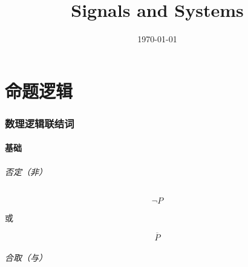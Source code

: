 \documentclass{article}
\title{Signals and Systems}
\author{}
\date{\today}
\begin{document}
\hypersetup{
    hidelinks,
    allcolors = black,
    breaklinks = true
}

\newtheorem{definition}{Definition}[subsection]
\newtheorem{theorem}{Theorem}[subsection]
\newtheorem{corollary}{Corollary}[theorem]
\renewcommand{\proofname}{\indent\bf Proof}

\def\e{\mathrm e}
\def\i{\mathrm i}
\def\j{\mathrm j}
\def\d{\mathrm d}
\def\C{\mathrm C}
\def\div{\mathrm{div}}
\def\rot{\mathrm{rot}}
\def\vecv{\vec{\mathrm v}}
\def\sr{\mathbb R}
\def\sn{\mathbb N}
\def\snp{\mathbb N^+}
\def\sc{\mathbb C}
\def\sz{\mathbb Z}
\def\impint{\int\limits_{-\infty}^{+\infty}}

\newcommand{\abs}[1]{\left|#1\right|}
\newcommand{\pare}[1]{\left(#1\right)}
\newcommand{\fourier}[1]{\mathscr F\pare{#1}}
\newcommand{\tfourier}[1]{\mathscr F^{-1}\pare{#1}}
\newcommand{\jacobi}[2]{\frac{\partial\pare{#1}}{\partial\pare{#2}}}

\begin{titlepage}
    \maketitle
\end{titlepage}

\tableofcontents
\newpage

\part{命题逻辑}

\section{数理逻辑联结词}

\subsection{基础}

\paragraph{否定（非）}

\[\neg P\]

或

\[\overline P\]

\paragraph{合取（与）}
\end{document}
